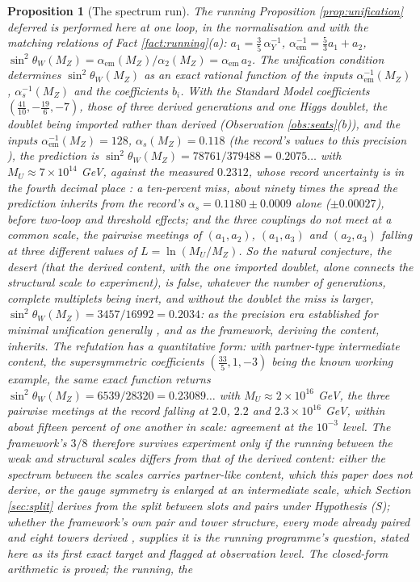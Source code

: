 \documentclass[11pt]{article}
\newtheorem{proposition}[theorem]{Proposition}
\theoremstyle{definition}
\begin{document}
\begin{proposition}[The spectrum run]\label{prop:desert}
The running Proposition \ref{prop:unification} deferred is performed here at one loop, in the normalisation and with the matching relations of Fact \ref{fact:running}(a): $a_{1} = \tfrac35\,\alpha_{Y}^{-1}$, $\alpha_{\mathrm{em}}^{-1} = \tfrac53 a_{1} + a_{2}$, $\sin^{2}\theta_{W}(M_{Z}) = \alpha_{\mathrm{em}}(M_{Z})/\alpha_{2}(M_{Z}) = \alpha_{\mathrm{em}}\,a_{2}$. The unification condition determines $\sin^{2}\theta_{W}(M_{Z})$ as an exact rational function of the inputs $\alpha_{\mathrm{em}}^{-1}(M_{Z})$, $\alpha_{s}^{-1}(M_{Z})$ and the coefficients $b_{i}$. With the Standard Model coefficients $(\tfrac{41}{10}, -\tfrac{19}{6}, -7)$, those of three derived generations and one Higgs doublet, the doublet being imported rather than derived (Observation \ref{obs:seats}(b)), and the inputs $\alpha_{\mathrm{em}}^{-1}(M_{Z}) = 128$, $\alpha_{s}(M_{Z}) = 0.118$ (the record's values to this precision \cite{PDG2024}), the prediction is $\sin^{2}\theta_{W}(M_{Z}) = 78761/379488 = 0.2075\ldots$ with $M_{U} \approx 7 \times 10^{14}$ GeV, against the measured $0.2312$, whose record uncertainty is in the fourth decimal place \cite{PDG2024}: a ten-percent miss, about ninety times the spread the prediction inherits from the record's $\alpha_{s} = 0.1180 \pm 0.0009$ alone ($\pm 0.00027$), before two-loop and threshold effects; and the three couplings do not meet at a common scale, the pairwise meetings of $(a_{1}, a_{2})$, $(a_{1}, a_{3})$ and $(a_{2}, a_{3})$ falling at three different values of $L = \ln(M_{U}/M_{Z})$. So the natural conjecture, the desert (that the derived content, with the one imported doublet, alone connects the structural scale to experiment), is false, whatever the number of generations, complete multiplets being inert, and without the doublet the miss is larger, $\sin^{2}\theta_{W}(M_{Z}) = 3457/16992 = 0.2034$: as the precision era established for minimal unification generally \cite{Amaldi1991}, and as the framework, deriving the content, inherits. The refutation has a quantitative form: with partner-type intermediate content, the supersymmetric coefficients $(\tfrac{33}{5}, 1, -3)$ being the known working example, the same exact function returns $\sin^{2}\theta_{W}(M_{Z}) = 6539/28320 = 0.23089\ldots$ with $M_{U} \approx 2 \times 10^{16}$ GeV, the three pairwise meetings at the record falling at $2.0$, $2.2$ and $2.3 \times 10^{16}$ GeV, within about fifteen percent of one another in scale: agreement at the $10^{-3}$ level. The framework's $3/8$ therefore survives experiment only if the running between the weak and structural scales differs from that of the derived content: either the spectrum between the scales carries partner-like content, which this paper does not derive, or the gauge symmetry is enlarged at an intermediate scale, which Section \ref{sec:split} derives from the split between slots and pairs under Hypothesis (S); whether the framework's own pair and tower structure, every mode already paired and eight towers derived \cite{ButlerT3, ButlerT14}, supplies it is the running programme's question, stated here as its first exact target and flagged at observation level. The closed-form arithmetic is proved; the running, the 
\end{proposition}
\end{document}
